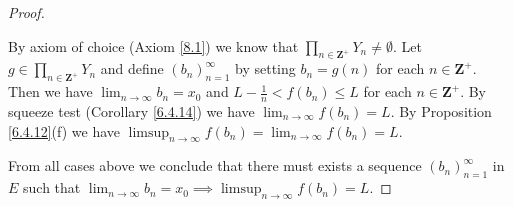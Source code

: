 \begin{proof}
\begin{itemize}
              By axiom of choice (Axiom \ref{8.1}) we know that \(\prod_{n \in \mathbf{Z}^+} Y_n \neq \emptyset\).
              Let \(g \in \prod_{n \in \mathbf{Z}^+} Y_n\) and define \((b_n)_{n = 1}^\infty\) by setting \(b_n = g(n)\) for each \(n \in \mathbf{Z}^+\).
              Then we have \(\lim_{n \to \infty} b_n = x_0\) and \(L - \frac{1}{n} < f(b_n) \leq L\) for each \(n \in \mathbf{Z}^+\).
              By squeeze test (Corollary \ref{6.4.14}) we have \(\lim_{n \to \infty} f(b_n) = L\).
              By Proposition \ref{6.4.12}(f) we have \(\limsup_{n \to \infty} f(b_n) = \lim_{n \to \infty} f(b_n) = L\).
    \end{itemize}
    From all cases above we conclude that there must exists a sequence \((b_n)_{n = 1}^\infty\) in \(E\) such that \(\lim_{n \to \infty} b_n = x_0 \implies \limsup_{n \to \infty} f(b_n) = L\).


\end{proof}
